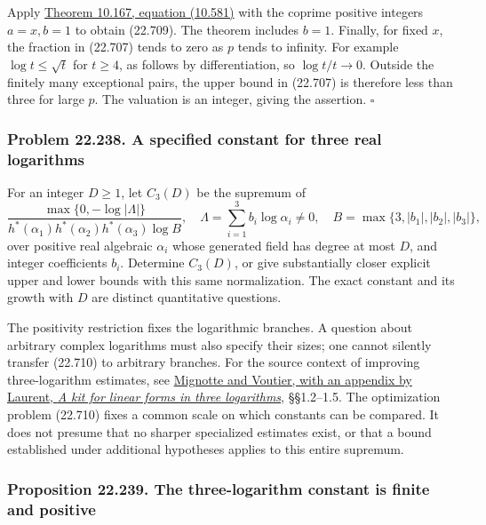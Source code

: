 \documentclass[
  11pt,
  a4paper,
]{article}
\begin{document}
Apply
\href{https://kokunoyumeto.github.io/open-math-courses-public/courses/TR-BAKER/TR-BAKER-10.html\#56-the-constant-283-for-fermat-differences-and-arbitrary-powers}{Theorem
10.167, equation (10.581)} with the coprime positive integers
\(a=x,b=1\) to obtain (22.709). The theorem includes \(b=1\). Finally,
for fixed \(x\), the fraction in (22.707) tends to zero as \(p\) tends
to infinity. For example \(\log t\le\sqrt t\) for \(t\ge4\), as follows
by differentiation, so \(\log t/t\longrightarrow0\). Outside the
finitely many exceptional pairs, the upper bound in (22.707) is
therefore less than three for large \(p\). The valuation is an integer,
giving the assertion. \(\square\)

\subsubsection{Problem 22.238. A specified constant for three real
logarithms}\label{problem-22.238.-a-specified-constant-for-three-real-logarithms}

For an integer \(D\ge1\), let \(C_3(D)\) be the supremum of \[
 \frac{\max\{0,-\log|\Lambda|\}}
 {h^*(\alpha_1)h^*(\alpha_2)h^*(\alpha_3)\log B},
 \quad
 \Lambda=\sum_{i=1}^3 b_i\log\alpha_i\ne0,
 \quad B=\max\{3,|b_1|,|b_2|,|b_3|\},
 \tag{22.710}
\] over positive real algebraic \(\alpha_i\) whose generated field has
degree at most \(D\), and integer coefficients \(b_i\). Determine
\(C_3(D)\), or give substantially closer explicit upper and lower bounds
with this same normalization. The exact constant and its growth with
\(D\) are distinct quantitative questions.

The positivity restriction fixes the logarithmic branches. A question
about arbitrary complex logarithms must also specify their sizes; one
cannot silently transfer (22.710) to arbitrary branches. For the source
context of improving three-logarithm estimates, see
\href{https://arxiv.org/pdf/2205.08899v3}{Mignotte and Voutier, with an
appendix by Laurent, \emph{A kit for linear forms in three logarithms}},
§§1.2--1.5. The optimization problem (22.710) fixes a common scale on
which constants can be compared. It does not presume that no sharper
specialized estimates exist, or that a bound established under
additional hypotheses applies to this entire supremum.

\subsubsection{Proposition 22.239. The three-logarithm constant is
finite and
positive}\label{proposition-22.239.-the-three-logarithm-constant-is-finite-and-positive}
\end{document}
